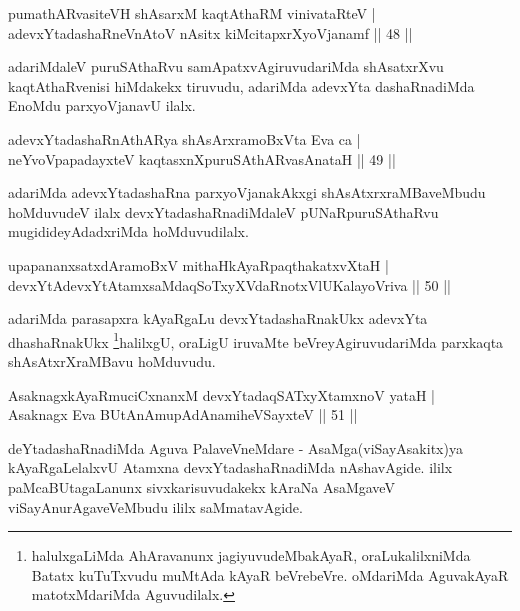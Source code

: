 \begin{shl}
pumathARvasiteVH shAsarxM kaqtAthaRM vinivataRteV |\\
adevxYtadashaRneVnAtoV nAsitx kiMcitapxrXyoVjanamf \hfill || 48 ||
\end{shl}

\begin{artha}
adariMdaleV puruSAthaRvu samApatxvAgiruvudariMda shAsatxrXvu kaqtAthaRvenisi hiMdakekx tiruvudu, adariMda adevxYta dashaRnadiMda EnoMdu parxyoVjanavU ilalx.
\end{artha}

\begin{shl}
adevxYtadashaRnAthARya shAsArxramoBxV\s ta Eva ca |\\
neYvoVpapadayxteV kaqtasxnXpuruSAthARvasAnataH \hfill || 49 ||
\end{shl}

\begin{artha}
adariMda adevxYtadashaRna parxyoVjanakAkxgi shAsAtxrxraMBaveMbudu hoMduvudeV ilalx devxYtadashaRnadiMdaleV pUNaRpuruSAthaRvu mugidideyAdadxriMda hoMduvudilalx.
\end{artha}


\begin{shl}
upapananxsatxdAramoBxV mithaHkAyaRpaqthakatxvXtaH |\\
devxYtAdevxYtAtamxsaMdaqSoTxyXVdaRnotxVlUKalayoVriva \hfill || 50 ||
\end{shl}

\begin{artha}
adariMda parasapxra kAyaRgaLu devxYtadashaRnakUkx adevxYta dhashaRnakUkx  
\footnote{halulxgaLiMda AhAravanunx jagiyuvudeMbakAyaR, oraLukalilxniMda Batatx kuTuTxvudu muMtAda kAyaR beVrebeVre. oMdariMda AguvakAyaR matotxMdariMda Aguvudilalx.}halilxgU, oraLigU iruvaMte beVreyAgiruvudariMda parxkaqta shAsAtxrXraMBavu hoMduvudu.
\end{artha}

\begin{shl}
AsaknagxkAyaRmuciCxnanxM devxYtadaqSATxyX\s \s tamxnoV yataH |\\
Asaknagx Eva BUtAnAmupAdAnamiheVSayxteV \hfill || 51 ||
\end{shl}

\begin{artha}
deYtadashaRnadiMda Aguva PalaveVneMdare - AsaMga(viSayAsakitx)ya kAyaRgaLelalxvU Atamxna  devxYtadashaRnadiMda nAshavAgide. ililx paMcaBUtagaLanunx sivxkarisuvudakekx kAraNa AsaMgaveV viSayAnurAgaveVeMbudu ililx saMmatavAgide.
\end{artha}

